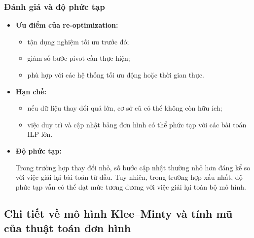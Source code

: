 \documentclass[fontsize=13pt,a4paper]{report}
\begin{document}





\subsubsection{Đánh giá và độ phức tạp}

\begin{itemize}

    \item \textbf{Ưu điểm của re-optimization:}

    \begin{itemize}
        \item tận dụng nghiệm tối ưu trước đó;
        \item giảm số bước pivot cần thực hiện;
        \item phù hợp với các hệ thống tối ưu động hoặc thời gian thực.
    \end{itemize}

    \item \textbf{Hạn chế:}

    \begin{itemize}
        \item nếu dữ liệu thay đổi quá lớn, cơ sở cũ có thể không còn hữu ích;
        \item việc duy trì và cập nhật bảng đơn hình có thể phức tạp với các bài toán ILP lớn.
    \end{itemize}

    \item \textbf{Độ phức tạp:}

    Trong trường hợp thay đổi nhỏ, số bước cập nhật thường nhỏ hơn đáng kể so với việc giải lại bài toán từ đầu. Tuy nhiên, trong trường hợp xấu nhất, độ phức tạp vẫn có thể đạt mức tương đương với việc giải lại toàn bộ mô hình.

\end{itemize}

\subsection{Chi tiết về mô hình Klee--Minty và tính mũ của thuật toán đơn hình}
\end{document}
